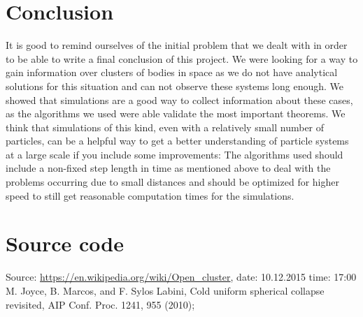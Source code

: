\documentclass[10pt,a4paper]{article}
\begin{document}
\section{Conclusion}
It is good to remind ourselves of the initial problem that we dealt with in order to be able to write a final conclusion of this project. We were looking for a way to gain information over clusters of bodies in space as we do not have analytical solutions for this situation and can not observe these systems long enough. We showed that simulations are a good way to collect information about these cases, as the algorithms we used were able validate the most important theorems. We think that simulations of this kind, even with a relatively small number of particles, can be a helpful way to get a better understanding of particle systems at a large scale if you include some improvements: The algorithms used should include a non-fixed step length in time as mentioned above to deal with the problems occurring due to small distances and should be optimized for higher speed to still get reasonable computation times for the simulations.

\section{Source code}

\begin{thebibliography}{mustermarke}
 Source: \url{https://en.wikipedia.org/wiki/Open_cluster}, date: 10.12.2015 time: 17:00
 M. Joyce, B. Marcos, and F. Sylos Labini, Cold uniform spherical collapse revisited,
AIP Conf. Proc. 1241, 955 (2010);
\end{thebibliography}
\end{document}
